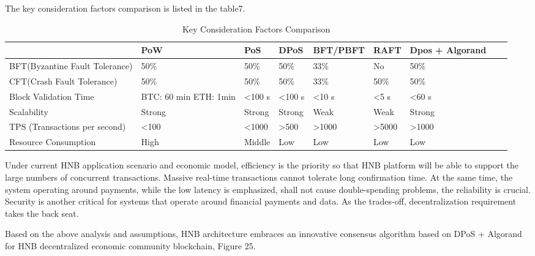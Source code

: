 \documentclass[fleqn,10pt]{SelfArx} %
\begin{document}
The key consideration factors comparison is listed in the table7.

\begin{table}[hbt]
\caption{Key Consideration Factors Comparison}
\centering
\begin{tabular}{lp{2cm}p{1.5cm}p{1.5cm}p{1.5cm}p{1.5cm}p{1.5cm}p{3cm}r}
\toprule
\qquad
& 
PoW
&
PoS
&
DPoS
&
BFT/PBFT
&
RAFT
&
Dpos + Algorand
\\
\midrule
BFT(Byzantine Fault Tolerance) & 50\%& 50\% &  50\% &  33\%& No &  50\%  \\
\midrule
CFT(Crash Fault Tolerance)  & 50\%& 50\% &  50\% &  33\%& 50\% &  50\%  \\
\midrule
Block Validation Time & BTC: 60 min ETH: 1min & \textless 100 s & \textless 100 s &  \textless 10 s & \textless 5 s &  \textless60 s  \\
\midrule
Scalability & Strong & Strong &  Strong & Weak & Weak &  Strong  \\

\midrule
TPS (Transactions per second) & \textless 100 & \textless 1000 &  \textgreater 500 & \textgreater 1000 & \textgreater 5000 & \textgreater 1000  \\
\midrule
Resource Consumption  & High & Middle &  Low & Low & Low &  Low  \\

\bottomrule
\end{tabular}
\label{tab:label}
\end{table}


Under current HNB application scenario and economic model, efficiency is the priority so that HNB platform will be able to support the large numbers of concurrent transactions. Massive real-time transactions cannot tolerate long confirmation time. At the same time, the system operating around payments, while the low latency is emphasized, shall not cause double-spending problems, the reliability is crucial. Security is another critical for systems that operate around financial payments and data. As the trades-off, decentralization requirement takes the back seat.

Based on the above analysis and assumptions, HNB architecture embraces an innovative consensus algorithm based on DPoS + Algorand for HNB decentralized economic community blockchain, Figure 25. \\
\end{document}
